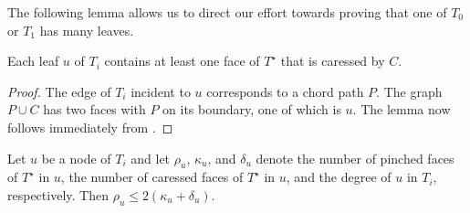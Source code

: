 \documentclass{patmorin}
\newcommand{\dual}[1]{{#1}^\star}
\begin{document}
The following lemma allows us to direct our effort towards proving that
one of $T_0$ or $T_1$ has many leaves.

\begin{lem}
   Each leaf $u$ of $T_i$ contains at least one face of $\dual{T}$
   that is caressed by $C$.
\end{lem}

\begin{proof}
   The edge of $T_i$ incident to $u$ corresponds to a chord path $P$. The
   graph $P\cup C$ has two faces with $P$ on its boundary, one of which
   is $u$.  The lemma now follows immediately from .
\end{proof}


\begin{lem}
   Let $u$ be a node of $T_i$ and let $\rho_u$, $\kappa_u$, and $\delta_u$ denote the number of pinched faces of $\dual{T}$ in $u$, the number of caressed faces of $\dual{T}$ in $u$, and the degree of $u$ in $T_i$, respectively.  Then $\rho_u \le 2(\kappa_u+\delta_u)$.
\end{lem}
\end{document}
